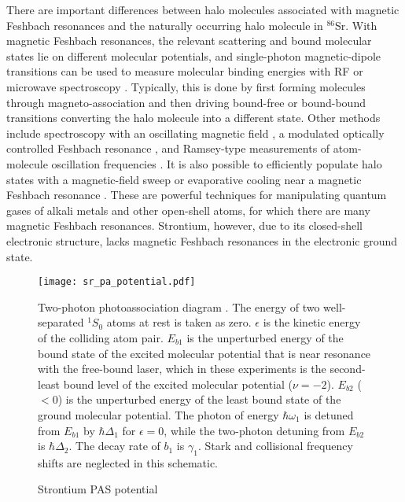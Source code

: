 
There are important differences between halo molecules associated with magnetic Feshbach resonances and the naturally occurring halo molecule in $^{86}$Sr. With magnetic Feshbach resonances, the relevant scattering and bound molecular states lie on different molecular potentials, and single-photon magnetic-dipole transitions can be used to measure molecular binding energies with RF or microwave spectroscopy \cite{cgj10,cju05,thw05b}. Typically, this is done by first forming molecules through magneto-association and then driving bound-free or bound-bound transitions converting the halo molecule into a different state. Other methods include spectroscopy with an oscillating magnetic field \cite{thw05b}, a modulated optically controlled Feshbach resonance \cite{chx15}, and Ramsey-type measurements of atom-molecule oscillation frequencies \cite{ckt03}. It is also possible to efficiently populate halo states with a magnetic-field sweep \cite{grj03} or evaporative cooling \cite{jba03} near a magnetic Feshbach resonance \cite{cgj10}. These are powerful techniques for manipulating quantum gases of alkali metals and other open-shell atoms, for which there are many magnetic Feshbach resonances. Strontium, however, due to its closed-shell electronic structure, lacks magnetic Feshbach resonances in the electronic ground state.


\begin{figure} \label{PASDiagram}
\centerline{
  \texttt{[image: sr\_pa\_potential.pdf]}}
  \caption{Strontium PAS potential}{Two-photon photoassociation diagram . The energy of two well-separated $^1S_0$ atoms at rest is taken as zero. $\epsilon$ is the kinetic energy of the colliding atom pair. $E_{b1}$ is the unperturbed energy of the bound state of the excited molecular potential that is near resonance with the free-bound laser, which in these experiments is the second-least bound level of the excited molecular potential ($\nu=-2$). $E_{b2}$ ($<0$) is the unperturbed energy of the least bound state of the ground molecular potential. The photon of energy $\hbar \omega_1$ is detuned from $E_{b1}$ by $\hbar \Delta_1$ for $\epsilon=0$, while the two-photon detuning from $E_{b2}$ is $\hbar \Delta_2$. The decay rate of $b_1$ is $\gamma_1$. Stark and collisional frequency shifts are neglected in this schematic.}
  
\end{figure}

